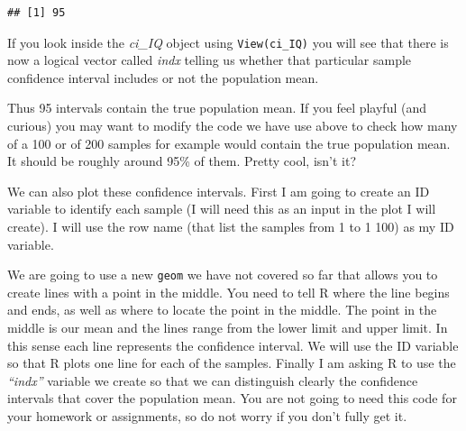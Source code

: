 \documentclass[
]{book}
\newenvironment{Shaded}{\begin{snugshade}}{\end{snugshade}}
\newcommand{\FunctionTok}[1]{\textcolor[rgb]{0.00,0.00,0.00}{#1}}
\newcommand{\NormalTok}[1]{#1}
\newcommand{\OtherTok}[1]{\textcolor[rgb]{0.56,0.35,0.01}{#1}}
\newcommand{\SpecialCharTok}[1]{\textcolor[rgb]{0.00,0.00,0.00}{#1}}
\begin{document}
\begin{verbatim}
## [1] 95
\end{verbatim}

If you look inside the \emph{ci\_IQ} object using \texttt{View(ci\_IQ)} you will see that there is now a logical vector called \emph{indx} telling us whether that particular sample confidence interval includes or not the population mean.

Thus 95 intervals contain the true population mean. If you feel playful (and curious) you may want to modify the code we have use above to check how many of a 100 or of 200 samples for example would contain the true population mean. It should be roughly around 95\% of them. Pretty cool, isn't it?

We can also plot these confidence intervals. First I am going to create an ID variable to identify each sample (I will need this as an input in the plot I will create). I will use the row name (that list the samples from 1 to 1 100) as my ID variable.

\begin{Shaded}
\end{Shaded}

We are going to use a new \texttt{geom} we have not covered so far that allows you to create lines with a point in the middle. You need to tell R where the line begins and ends, as well as where to locate the point in the middle. The point in the middle is our mean and the lines range from the lower limit and upper limit. In this sense each line represents the confidence interval. We will use the ID variable so that R plots one line for each of the samples. Finally I am asking R to use the \emph{``indx''} variable we create so that we can distinguish clearly the confidence intervals that cover the population mean. You are not going to need this code for your homework or assignments, so do not worry if you don't fully get it.
\end{document}
